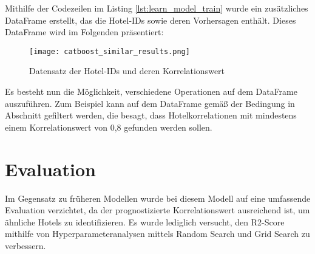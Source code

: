 Mithilfe der Codezeilen im Listing \ref{lst:learn_model_train} wurde ein zusätzliches DataFrame erstellt, das die Hotel-IDs sowie deren Vorhersagen enthält. Dieses DataFrame wird im Folgenden präsentiert:

\begin{figure}[h]
    \centering
    \texttt{[image: catboost\_similar\_results.png]}
    \caption[Datensatz der Hotel-IDs und deren Korrelationswert]{Datensatz der Hotel-IDs und deren Korrelationswert}
    \label{img:catboost_similar_results}
\end{figure}

Es besteht nun die Möglichkeit, verschiedene Operationen auf dem DataFrame auszuführen. Zum Beispiel kann auf dem DataFrame gemäß der Bedingung in Abschnitt \emph{} gefiltert werden, die besagt, dass Hotelkorrelationen mit mindestens einem Korrelationswert von 0,8 gefunden werden sollen.

\section{Evaluation}
\label{subsubsec:learn_eval}
Im Gegensatz zu früheren Modellen wurde bei diesem Modell auf eine umfassende Evaluation verzichtet, da der prognostizierte Korrelationswert ausreichend ist, um ähnliche Hotels zu identifizieren. Es wurde lediglich versucht, den R2-Score mithilfe von Hyperparameteranalysen mittels Random Search 
\cite{AdapRandomSearch4.05.2009} und Grid Search \cite{Liashchynskyi.12.12.2019} zu verbessern.


